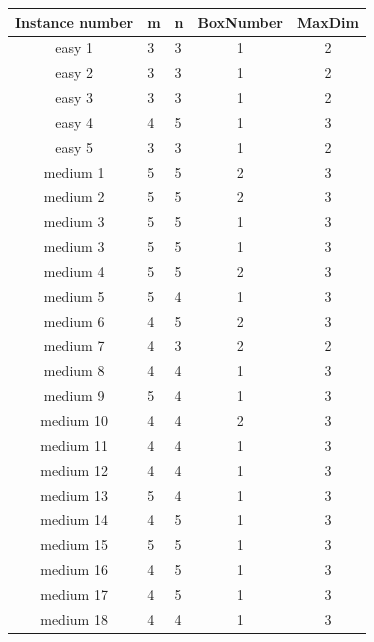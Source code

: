 \documentclass[headinclude, footinclude, abstract=on]{scrarticle}
\begin{document}
\begin{longtable}{|c||l|l|c|c|}
\hline
Instance number & m & n & BoxNumber & MaxDim      \\ 
\hline
easy 1           & 3 & 3 & 1         & 2           \\ 
\hline
easy 2           & 3 & 3 & 1         & 2           \\ 
\hline
easy 3           & 3 & 3 & 1         & 2           \\ 
\hline
easy 4           & 4 & 5 & 1         & 3           \\ 
\hline
easy 5           & 3 & 3 & 1         & 2           \\ 
\hline
medium 1         & 5 & 5 & 2         & 3           \\ 
\hline
medium 2         & 5 & 5 & 2         & 3           \\ 
\hline
medium 3         & 5 & 5 & 1         & 3           \\ 
\hline
medium 3         & 5 & 5 & 1         & 3           \\ 
\hline
medium 4         & 5 & 5 & 2         & 3           \\ 
\hline
medium 5         & 5 & 4 & 1         & 3           \\ 
\hline
medium 6         & 4 & 5 & 2         & 3           \\ 
\hline
medium 7         & 4 & 3 & 2         & 2           \\ 
\hline
medium 8         & 4 & 4 & 1         & 3           \\ 
\hline
medium 9         & 5 & 4 & 1         & 3           \\ 
\hline
medium 10        & 4 & 4 & 2         & 3           \\ 
\hline
medium 11        & 4 & 4 & 1         & 3           \\ 
\hline
medium 12        & 4 & 4 & 1         & 3           \\ 
\hline
medium 13        & 5 & 4 & 1         & 3           \\ 
\hline
medium 14        & 4 & 5 & 1         & 3           \\ 
\hline
medium 15        & 5 & 5 & 1         & 3           \\ 
\hline
medium 16        & 4 & 5 & 1         & 3           \\ 
\hline
medium 17        & 4 & 5 & 1         & 3           \\ 
\hline
medium 18        & 4 & 4 & 1         & 3           \\ 

\end{longtable}
\end{document}
